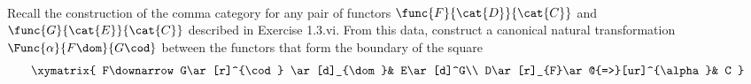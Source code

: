 \documentclass[main.tex]{subfiles}
\begin{document}
\paragraph{}
%

\begin{exercise}
	Recall the construction of the comma category for any pair of functors
	$\func{F}{\cat{D}}{\cat{C}}$ and $\func{G}{\cat{E}}{\cat{C}}$ described in
	Exercise 1.3.vi. From this data, construct a canonical natural
	transformation $\Func{\alpha}{F\dom}{G\cod}$ between the functors that form
	the boundary of the square
	\[\xymatrix{
			F\downarrow G\ar[r]^{\cod} \ar[d]_{\dom}& E\ar[d]^G\\
			D\ar[r]_{F}\ar@{=>}[ur]^{\alpha}& C
		}\]
\end{exercise}
\end{document}

